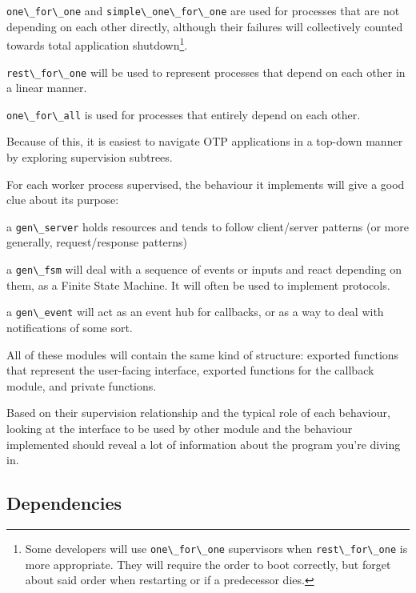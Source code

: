 \documentclass[11pt, oneside]{book}   	%
\newcommand{\module}[1]{\Verb`#1`}
\newcommand{\expression}[1]{\Verb`#1`}
\begin{document}
\begin{itemize*}
	\item \expression{one\_for\_one} and \expression{simple\_one\_for\_one} are used for processes that are not depending on each other directly, although their failures will collectively counted towards total application shutdown\footnote{Some developers will use \expression{one\_for\_one} supervisors when \expression{rest\_for\_one} is more appropriate. They will require the order to boot correctly, but forget about said order when restarting or if a predecessor dies.}.
	\item \expression{rest\_for\_one} will be used to represent processes that depend on each other in a linear manner.
	\item \expression{one\_for\_all} is used for processes that entirely depend on each other.
\end{itemize*}

Because of this, it is easiest to navigate OTP applications in a top-down manner by exploring supervision subtrees. 

For each worker process supervised, the behaviour it implements will give a good clue about its purpose:

\begin{itemize*}
	\item a \module{gen\_server} holds resources and tends to follow client/server patterns (or more generally, request/response patterns)
	\item a \module{gen\_fsm} will deal with a sequence of events or inputs and react depending on them, as a Finite State Machine. It will often be used to implement protocols.
	\item a \module{gen\_event} will act as an event hub for callbacks, or as a way to deal with notifications of some sort.
\end{itemize*}

All of these modules will contain the same kind of structure: exported functions that represent the user-facing interface, exported functions for the callback module, and private functions.

Based on their supervision relationship and the typical role of each behaviour, looking at the interface to be used by other module and the behaviour implemented should reveal a lot of information about the program you're diving in.

\subsection{Dependencies}
\label{subsec:dive-dependencies}
\end{document}
